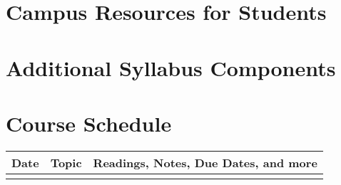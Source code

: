 \documentclass[10pt]{article}
\begin{document}
\section{Campus Resources for Students}

\section{Additional Syllabus Components}


\pagebreak

\section*{Course Schedule}
\begin{tabular}[h]{lll}
{\bfseries Date}&{\bfseries Topic}&{\bfseries Readings, Notes, Due Dates, and more}\\ \hline
&&\\
\end{tabular}


%
\end{document}
